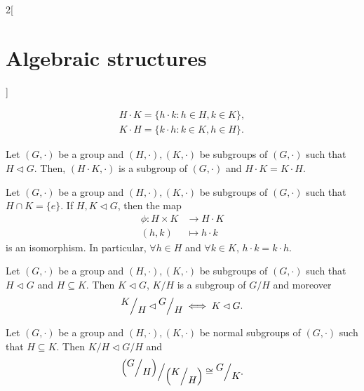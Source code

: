\documentclass[class=article,10pt,crop=false]{standalone}
\begin{document}
\begin{multicols}{2}[\section{Algebraic structures}]
\begin{definition}
\begin{gather*}
    H\cdot K=\{h\cdot k:h\in H,k\in K\},\\
    K\cdot H=\{k\cdot h:k\in K,h\in H\}.
\end{gather*}
\end{definition}
\begin{prop}
Let $(G,\cdot)$ be a group and $(H,\cdot),(K,\cdot)$ be subgroups of $(G,\cdot)$ such that $H\lhd G$. Then, $(H\cdot K,\cdot)$ is a subgroup of $(G,\cdot)$ and $H\cdot K=K\cdot H$.
\end{prop}
\begin{prop}
Let $(G,\cdot)$ be a group and $(H,\cdot),(K,\cdot)$ be subgroups of $(G,\cdot)$ such that $H\cap K=\{e\}$. If $H,K\lhd G$, then the map 
\begin{align*}
    \phi:H\times K&\longrightarrow H\cdot K\\
    (h,k)&\longmapsto h\cdot k
\end{align*}
is an isomorphism. In particular, $\forall h\in H$ and $\forall k\in K$, $h\cdot k=k\cdot h$.
\end{prop}
\begin{theorem}

\end{theorem}
\begin{lemma}
Let $(G,\cdot)$ be a group and $(H,\cdot),(K,\cdot)$ be subgroups of $(G,\cdot)$ such that $H\lhd G$ and $H\subseteq K$. Then $K\lhd G$, $K/H$ is a subgroup of $G/H$ and moreover $$\quot{K}{H}\lhd\quot{G}{H}\iff K\lhd G.$$
\end{lemma}
\begin{theorem}
Let $(G,\cdot)$ be a group and $(H,\cdot),(K,\cdot)$ be normal subgroups of $(G,\cdot)$ such that $H\subseteq K$. Then $K/H\lhd G/H$ and $$\quot{\left(\quot{G}{H}\right)}{\left(\quot{K}{H}\right)}\cong\quot{G}{K}.$$
\end{theorem}
\end{multicols}
\end{document}
